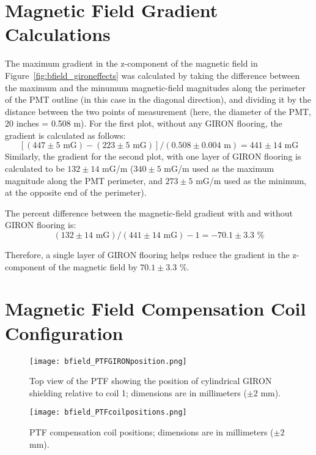 \appendix

\section{Magnetic Field Gradient Calculations}
\label{Appendix:MagneticFieldGradientCalculations}

The maximum gradient in the z-component of the magnetic field in Figure~\ref{fig:bfield_gironeffects} was calculated by taking the difference between the maximum and the minumum magnetic-field magnitudes along the perimeter of the PMT outline (in this case in the diagonal direction), and dividing it by the distance between the two points of measurement (here, the diameter of the PMT, 20 inches = 0.508 m).
For the first plot, without any GIRON flooring, the gradient is calculated as follows:
\[[(447\pm5 \text{ mG}) - (223\pm5 \text{ mG})]/ (0.508\pm0.004 \text{ m} ) = 441\pm14 \text{ mG} \]
Similarly, the gradient for the second plot, with one layer of GIRON flooring is calculated to be $ 132\pm14 $ mG/m ($ 340\pm5 $ mG/m used as the maximum magnitude along the PMT perimeter, and $ 273\pm5 $ mG/m used as the minimum, at the opposite end of the perimeter).

The percent difference between the magnetic-field gradient with and without GIRON flooring is:
\[(132\pm14 \text{ mG})/(441\pm14 \text{ mG}) - 1 = -70.1\pm3.3 \text{ \%}\]

Therefore, a single layer of GIRON flooring helps reduce the gradient in the z-component of the magnetic field by $ 70.1\pm3.3 $ \%.

\newpage
\section{Magnetic Field Compensation Coil Configuration}
\label{Appendix:CoilPositions}
%
\begin{figure}[h!]
   \begin{center}
   \texttt{[image: bfield\_PTFGIRONposition.png]}
   \caption{Top view of the PTF showing the position of cylindrical GIRON shielding relative to coil 1; dimensions are in millimeters ($\pm2$ mm).}
   \label{fig:gironpos}
   \end{center}
\end{figure}
%
%
\begin{figure}[hp]
   \begin{center}
   \texttt{[image: bfield\_PTFcoilpositions.png]}
   \caption{PTF compensation coil positions; dimensions are in millimeters ($\pm2$ mm).}
   \label{fig:coilpos}
   \end{center}
\end{figure}

